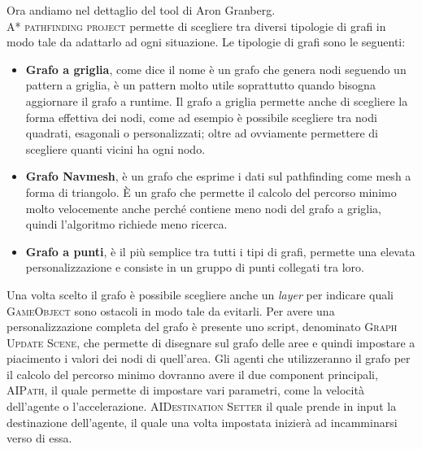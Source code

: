\documentclass[12pt, openany]{book}
\begin{document}
		Ora andiamo nel dettaglio del tool di Aron Granberg. \\
		\textsc{A* pathfinding project} permette di scegliere tra diversi tipologie di grafi in modo tale da adattarlo ad ogni situazione. Le tipologie di grafi sono le seguenti:
		\begin{itemize}
			\item \textbf{Grafo a griglia}, come dice il nome è un grafo che genera nodi seguendo un pattern a griglia, è un pattern molto utile soprattutto quando bisogna aggiornare il grafo a runtime. Il grafo a griglia permette anche di scegliere la forma effettiva dei nodi, come ad esempio è possibile scegliere tra nodi quadrati, esagonali o personalizzati; oltre ad ovviamente permettere di scegliere quanti vicini ha ogni nodo.
			\item \textbf{Grafo Navmesh}, è un grafo che esprime i dati sul pathfinding come mesh a forma di triangolo. È un grafo che permette il calcolo del percorso minimo molto velocemente anche perché contiene meno nodi del grafo a griglia, quindi l'algoritmo richiede meno ricerca.
			\item \textbf{Grafo a punti}, è il più semplice tra tutti i tipi di grafi, permette una elevata personalizzazione e consiste in un gruppo di punti collegati tra loro.
		\end{itemize}
	Una volta scelto il grafo è possibile scegliere anche un \emph{layer} per indicare quali \textsc{GameObject} sono ostacoli in modo tale da evitarli.
	Per avere una personalizzazione completa del grafo è presente uno script, denominato \textsc{Graph Update Scene}, che permette di disegnare sul grafo delle aree e quindi impostare a piacimento i valori dei nodi di quell'area.
	Gli agenti che utilizzeranno il grafo per il calcolo del percorso minimo dovranno avere il due component principali, \textsc{AIPath}, il quale permette di impostare vari parametri, come la velocità dell'agente o l'accelerazione. \textsc{AIDestination Setter} il quale prende in input la destinazione dell'agente, il quale una volta impostata inizierà ad incamminarsi verso di essa. 
	
\end{document}
